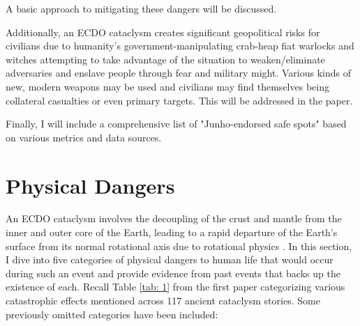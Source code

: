 \documentclass[10pt,twocolumn,letterpaper]{article}
\begin{document}
A basic approach to mitigating these dangers will be discussed.

Additionally, an ECDO cataclysm creates significant geopolitical risks for civilians due to humanity's government-manipulating crab-heap fiat warlocks and witches attempting to take advantage of the situation to weaken/eliminate adversaries and enslave people through fear and military might. Various kinds of new, modern weapons may be used and civilians may find themselves being collateral casualties or even primary targets. This will be addressed in the paper.

Finally, I will include a comprehensive list of "Junho-endorsed safe spots" based on various metrics and data sources.

\section{Physical Dangers}

An ECDO cataclysm involves the decoupling of the crust and mantle from the inner and outer core of the Earth, leading to a rapid departure of the Earth's surface from its normal rotational axis due to rotational physics \cite{1}. In this section, I dive into five categories of physical dangers to human life that would occur during such an event and provide evidence from past events that backs up the existence of each. Recall Table \ref{tab: 1} from the first paper categorizing various catastrophic effects mentioned across 117 ancient cataclysm stories. Some previously omitted categories have been included:
\end{document}
